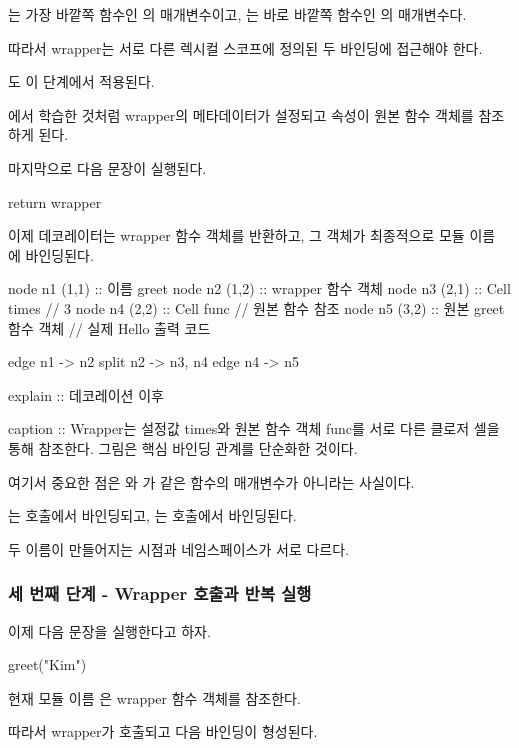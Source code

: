 는 가장 바깥쪽 함수인 의 매개변수이고, 는 바로 바깥쪽 함수인 의 매개변수다.

따라서 wrapper는 서로 다른 렉시컬 스코프에 정의된 두 바인딩에 접근해야 한다.

도 이 단계에서 적용된다.

에서 학습한 것처럼 wrapper의 메타데이터가 설정되고  속성이 원본 함수 객체를 참조하게 된다.

마지막으로 다음 문장이 실행된다.

\begin{dhkcode}
return wrapper
\end{dhkcode}

이제 데코레이터는 wrapper 함수 객체를 반환하고, 그 객체가 최종적으로 모듈 이름 에 바인딩된다.

\begin{dhkgraph}[uniform]
node n1 (1,1) :: 이름 greet
node n2 (1,2) :: wrapper 함수 객체
node n3 (2,1) :: Cell times // 3
node n4 (2,2) :: Cell func // 원본 함수 참조
node n5 (3,2) :: 원본 greet 함수 객체 // 실제 Hello 출력 코드

edge n1 -> n2
split n2 -> n3, n4
edge n4 -> n5

explain :: 데코레이션 이후

caption :: Wrapper는 설정값 times와 원본 함수 객체 func를 서로 다른 클로저 셀을 통해 참조한다. 그림은 핵심 바인딩 관계를 단순화한 것이다.
\end{dhkgraph}

여기서 중요한 점은 와 가 같은 함수의 매개변수가 아니라는 사실이다.

는  호출에서 바인딩되고, 는  호출에서 바인딩된다.

두 이름이 만들어지는 시점과 네임스페이스가 서로 다르다.

\subsubsection{세 번째 단계 - Wrapper 호출과 반복 실행}

이제 다음 문장을 실행한다고 하자.

\begin{dhkcode}
greet("Kim")
\end{dhkcode}

현재 모듈 이름 은 wrapper 함수 객체를 참조한다.

따라서 wrapper가 호출되고 다음 바인딩이 형성된다.

